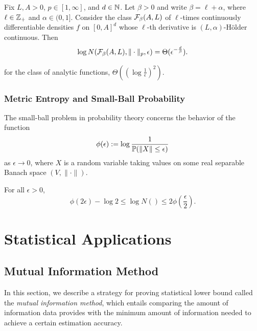 \begin{theorem}
    Fix $L,A>0$, $p\in [1,\infty]$, and $d\in\mathbb{N}$.
    Let $\beta>0$ and write $\beta=\ell+\alpha$, where $\ell\in\mathbb{Z}_+$ and $\alpha\in(0,1]$.
    Consider the class $\mathcal{F}_\beta(A,L)$ of $\ell$-times continuously differentiable densities $f$ on $[0,A]^d$ whose $\ell$-th derivative is $(L,\alpha)$-H\"{o}lder continuous.
    Then 
    \[\log N(\mathcal{F}_\beta(A,L),\|\cdot\|_p,\epsilon)=\Theta(\epsilon^{-\frac{d}{\beta}}).\]  
\end{theorem}

for the class of analytic functions, $\Theta((\log\frac{1}{\epsilon})^2)$.

\subsection{Metric Entropy and Small-Ball Probability}

The small-ball problem in probability theory concerns the behavior of the function 
\[\phi(\epsilon):=\log\frac{1}{\mathbb{P}(\|X\|\leq \epsilon)}\]
as $\epsilon\to 0$, where $X$ is a random variable taking values on some real separable Banach space $(V,\|\cdot\|)$.


\begin{theorem}
    For all $\epsilon>0$,
    \[\phi(2\epsilon)-\log 2\leq \log N()\leq 2\phi(\frac{\epsilon}{2}).\]
\end{theorem}

\chapter{Statistical Applications}


\section{Mutual Information Method}

In this section, we describe a strategy for proving statistical lower bound called the \textit{mutual information method},
which entails comparing the amount of information data provides with the minimum amount of information needed to achieve a certain estimation accuracy.

